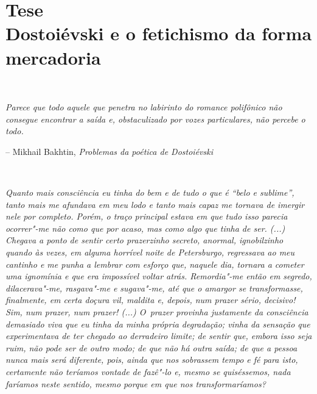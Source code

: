 {\part[Parte \versal{I} -- Tese]
{Tese\\[\bigskipamount] 
      \large Dostoiévski e o fetichismo da forma mercadoria}



\, \ 
\begin{minipage}{0.84\textwidth}
\scriptsize\emph{Parece que todo aquele que penetra no labirinto do romance polifônico
não consegue encontrar a saída e, obstaculizado por vozes particulares,
não percebe o todo.}

\smallskip
\hspace*{\fill}-- Mikhail Bakhtin, \emph{Problemas da poética de Dostoiévski}\footnotemark
\end{minipage}

\bigskip

\, \ 
\begin{minipage}{0.84\textwidth}
\scriptsize\emph{Quanto mais consciência eu tinha do bem e de tudo o que é ``belo e
sublime'', tanto mais me afundava em meu lodo e tanto mais capaz me
tornava de imergir nele por completo. Porém, o traço principal estava em
que tudo isso parecia ocorrer"-me não como que por acaso, mas como algo
que tinha de ser. (...) Chegava a ponto de sentir certo prazerzinho
secreto, anormal, ignobilzinho quando às vezes, em alguma horrível noite
de Petersburgo, regressava ao meu cantinho e me punha a lembrar com
esforço que, naquele dia, tornara a cometer uma ignomínia e que era
impossível voltar atrás. Remordia"-me então em segredo, dilacerava"-me,
rasgava"-me e sugava"-me, até que o amargor se transformasse, finalmente,
em certa doçura vil, maldita e, depois, num prazer sério, decisivo! Sim,
num prazer, num prazer! (...) O~prazer provinha justamente da
consciência demasiado viva que eu tinha da minha própria degradação;
vinha da sensação que experimentava de ter chegado ao derradeiro limite;
de sentir que, embora isso seja ruim, não pode ser de outro modo; de que
não há outra saída; de que a pessoa nunca mais será diferente, pois,
ainda que nos sobrassem tempo e fé para isto, certamente não teríamos
vontade de fazê"-lo e, mesmo se quiséssemos, nada faríamos neste sentido,
mesmo porque em que nos transformaríamos?}


\end{minipage}}
